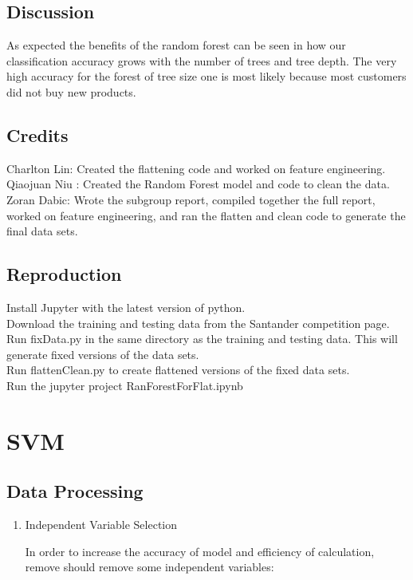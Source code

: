 \documentclass{article}
\begin{document}
\begin{spacing}{1}
\begin{large}
\subsection{Discussion}

As expected the benefits of the random forest can be seen in how our classification accuracy grows with the number of trees and tree depth. The very high accuracy for the forest of tree size one is most likely because most customers did not buy new products.


\subsection{Credits}

Charlton Lin: Created the flattening code and worked on feature engineering.
Qiaojuan Niu : Created the Random Forest model and code to clean the data.
Zoran Dabic: Wrote the subgroup report, compiled together the full report, worked on feature engineering, and ran the flatten and clean code to generate the final data sets.

\subsection{Reproduction}

Install Jupyter with the latest version of python. \\
Download the training and testing data from the Santander competition page. \\
Run fixData.py in the same directory as the training and testing data. This will generate fixed versions of the data sets. \\
Run flattenClean.py to create flattened versions of the fixed data sets. \\
Run the jupyter project RanForestForFlat.ipynb \\

\section{SVM}

\subsection{Data Processing}
\begin{enumerate}
	\item Independent Variable Selection

	In order to increase the accuracy of model and efficiency of calculation, remove should remove some independent variables:


\end{enumerate}
\end{large}
\end{spacing}
\end{document}
